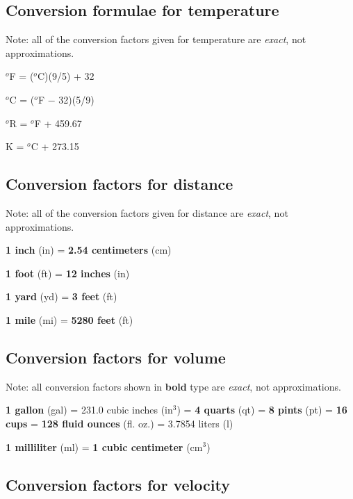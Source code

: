 \filbreak
\subsection{Conversion formulae for temperature}

Note: all of the conversion factors given for temperature are \textit{exact}, not approximations.

\vskip 10pt

\noindent
$^{o}$F = ($^{o}$C)(9/5) + 32

\noindent
$^{o}$C = ($^{o}$F $-$ 32)(5/9)

\noindent
$^{o}$R = $^{o}$F + 459.67

\noindent
K = $^{o}$C + 273.15




\filbreak
\subsection{Conversion factors for distance}

Note: all of the conversion factors given for distance are \textit{exact}, not approximations.

\vskip 10pt

\noindent
\textbf{1 inch} (in) = \textbf{2.54 centimeters} (cm)

\noindent
\textbf{1 foot} (ft) = \textbf{12 inches} (in)

\noindent
\textbf{1 yard} (yd) = \textbf{3 feet} (ft)

\noindent
\textbf{1 mile} (mi) = \textbf{5280 feet} (ft)




\filbreak
\subsection{Conversion factors for volume}

Note: all conversion factors shown in \textbf{bold} type are \textit{exact}, not approximations.

\vskip 10pt

\noindent
\textbf{1 gallon} (gal) = 231.0 cubic inches (in$^{3}$) = \textbf{4 quarts} (qt) = \textbf{8 pints} (pt) = \textbf{16 cups} = \textbf{128 fluid ounces} (fl. oz.) = 3.7854 liters (l)

\vskip 10pt

\noindent
\textbf{1 milliliter} (ml) = \textbf{1 cubic centimeter} (cm$^{3}$)




\filbreak
\subsection{Conversion factors for velocity}

